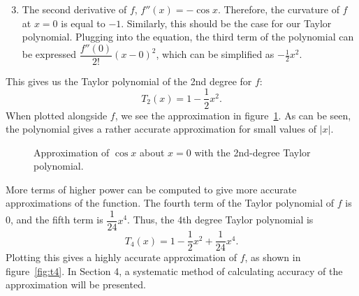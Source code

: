 \documentclass[a4paper, 12pt]{article}
\begin{document}
\begin{enumerate}
\setcounter{enumi}{2}
\item The second derivative of $f$, $f''(x) = - \cos x$. Therefore, the curvature of $f$ at $x=0$ is equal to $-1$. Similarly, this should be the case for our Taylor polynomial. Plugging into the equation, the third term of the polynomial can be expressed $\dfrac{f''(0)}{2!}(x-0)^2$, which can be simplified as $-\frac{1}{2}x^2$.
\end{enumerate}
This gives us the Taylor polynomial of the 2nd degree for $f$: 
\begin{equation}
T_2(x) = 1 - \frac{1}{2}x^2 .
\end{equation}
When plotted alongside $f$, we see the approximation in figure~\ref{fig:t2}. As can be seen, the polynomial gives a rather accurate approximation for small values of $|x|$.

\begin{figure}[H]
\centering
{}
\caption{Approximation of $\cos x$ about $x=0$ with the 2nd-degree Taylor polynomial.}
\label{fig:t2}
\end{figure}

More terms of higher power can be computed to give more accurate approximations of the function. The fourth term of the Taylor polynomial of $f$ is 0, and the fifth term is $\dfrac{1}{24}x^4$. Thus, the 4th degree Taylor polynomial is 
\begin{equation}
T_4(x) = 1 - \frac{1}{2}x^2 + \frac{1}{24}x^4 .
\end{equation}
Plotting this gives a highly accurate approximation of $f$, as shown in figure~\ref{fig:t4}. In Section 4, a systematic method of calculating accuracy of the approximation will be presented.
\end{document}
